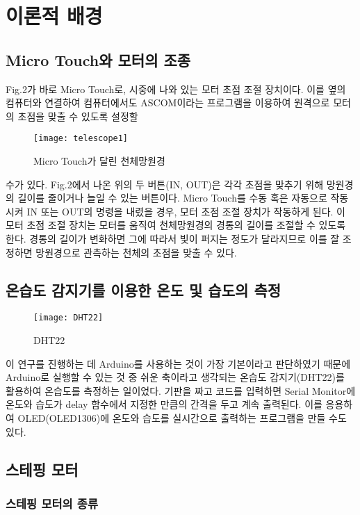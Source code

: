 \section{이론적 배경}

\subsection{Micro Touch와 모터의 조종}

Fig.2가 바로 Micro Touch로, 시중에 나와 있는 모터 초점 조절 장치이다. 이를 옆의 컴퓨터와 연결하여 컴퓨터에서도 ASCOM이라는 프로그램을 이용하여 원격으로 모터의 초점을 맞출 수 있도록 설정할 
\begin{wrapfigure}{l}{0.25\textwidth}
	\texttt{[image: telescope1]}
	\caption{Micro Touch가 달린 천체망원경}
	\label{fig:telescope1}
\end{wrapfigure}
수가 있다. Fig.2에서 나온 위의 두 버튼(IN, OUT)은 각각 초점을 맞추기 위해 망원경의 길이를 줄이거나 늘일 수 있는 버튼이다. Micro Touch를 수동 혹은 자동으로 작동시켜 IN 또는 OUT의 명령을 내렸을 경우, 모터 초점 조절 장치가 작동하게 된다. 이 모터 초점 조절 장치는 모터를 움직여 천체망원경의 경통의 길이를 조절할 수 있도록 한다. 경통의 길이가 변화하면 그에 따라서 빛이 퍼지는 정도가 달라지므로 이를 잘 조정하면 망원경으로 관측하는 천체의 초점을 맞출 수 있다.

\subsection{온습도 감지기를 이용한 온도 및 습도의 측정}

\begin{wrapfigure}{l}{0.05\textwidth}
	\texttt{[image: DHT22]}
	\caption{DHT22}
	\label{fig:DHT22}
\end{wrapfigure}
이 연구를 진행하는 데 Arduino를 사용하는 것이 가장 기본이라고 판단하였기 때문에 Arduino로 실행할 수 있는 것 중 쉬운 축이라고 생각되는 온습도 감지기(DHT22)를 활용하여 온습도를 측정하는 일이었다. 기판을 짜고 코드를 입력하면 Serial Monitor에 온도와 습도가 delay 함수에서 지정한 만큼의 간격을 두고 계속 출력된다. 이를 응용하여 OLED(OLED1306)에 온도와 습도를 실시간으로 출력하는 프로그램을 만들 수도 있다.

\subsection{스테핑 모터}

\subsubsection{스테핑 모터의 종류}

